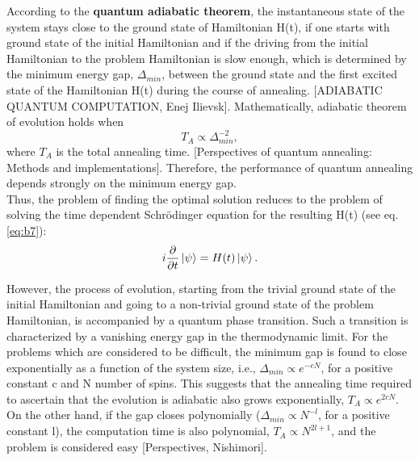 \documentclass[../main.tex]{subfiles}
\begin{document}
According to the \textbf{quantum adiabatic theorem}, the instantaneous state of the system stays close to the ground state of Hamiltonian H(t), if one starts with ground state of the initial Hamiltonian and if the driving from the initial Hamiltonian to the problem Hamiltonian is slow enough, which is determined by the minimum energy gap, $\Delta_{min}$, between the ground state and the first excited state of the Hamiltonian H(t) during the course of annealing. [ADIABATIC QUANTUM COMPUTATION, Enej Ilievsk]. Mathematically, adiabatic theorem of evolution holds when 
\begin{equation}
T_A \propto {\Delta}_{min}^{-2}, \label{eq:b8}
\end{equation}
where $T_A$ is the total annealing time. [Perspectives of quantum annealing: Methods and implementations]. Therefore, the performance of quantum annealing depends strongly on the minimum energy gap.\\
Thus, the problem of finding the optimal solution reduces to the problem of solving the time dependent Schr{\"o}dinger equation for the resulting H(t) (see eq. \ref{eq:b7}):
\begin{equation}
i\frac{\partial}{\partial t}\ket{\psi}=H(t)\ket{\psi}.    \label{eq:b9}
\end{equation}

However, the process of evolution, starting from the trivial ground state of the initial Hamiltonian and going to a non-trivial ground state of the problem Hamiltonian, is accompanied by a quantum phase transition. Such a transition is characterized by a vanishing energy gap in the thermodynamic limit. For the problems which are considered to be difficult, the minimum gap is found to close exponentially as a function of the system size, i.e., $\Delta_{min} \propto e^{-cN}$, for a positive constant c and N number of spins. This suggests that the annealing time required to ascertain that the evolution is adiabatic also grows exponentially,   $T_A \propto e^{2cN}$. On the other hand, if the gap closes polynomially ($\Delta_{min} \propto N^{-l}$, for a positive constant l), the computation time is also polynomial, $T_A \propto N^{2l+1}$, and the problem is considered easy [Perspectives, Nishimori].
\end{document}
